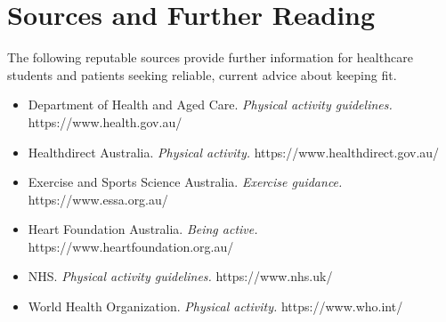 \section*{Sources and Further Reading}
The following reputable sources provide further information for healthcare students and patients seeking reliable, current advice about keeping fit.
\begin{itemize}
    \item Department of Health and Aged Care. \textit{Physical activity guidelines.} https://www.health.gov.au/
    \item Healthdirect Australia. \textit{Physical activity.} https://www.healthdirect.gov.au/
    \item Exercise and Sports Science Australia. \textit{Exercise guidance.} https://www.essa.org.au/
    \item Heart Foundation Australia. \textit{Being active.} https://www.heartfoundation.org.au/
    \item NHS. \textit{Physical activity guidelines.} https://www.nhs.uk/
    \item World Health Organization. \textit{Physical activity.} https://www.who.int/
\end{itemize}

